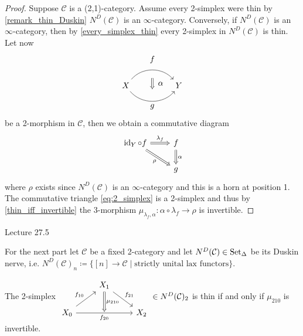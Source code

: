 \begin{proof}
	Suppose $ \mathcal{ C } $ is a  (2,1)-category.
	Assume every 2-simplex were thin by \ref{remark_thin_Duskin} $ N^D ( \mathcal{ C } ) $ is an $ \infty $-category.
	Conversely, if $ N^D (\mathcal{ C } ) $ is an $ \infty $-category, then by \ref{every_simplex_thin} every 2-simplex in $ N^D ( \mathcal{ C } ) $ is thin.
	Let now
	\[
	\begin{tikzcd}
		X
		\arrow[bend left=50]{rr}[name=U',label=above:$ f $]{}
		\arrow[bend right=50]{rr}[name=D',label=below:$ g $]{}
		&&
		Y
		\arrow[shorten <=10pt,shorten >=10pt,Rightarrow,to path={(U')-- node[label=right:$ \alpha $] {} (D')}]{} 
	\end{tikzcd}
	\]
	be a 2-morphism in $ \mathcal{ C } $, then we obtain a commutative diagram
	\begin{equation}
	\label{eq:2_simplex}
		\begin{tikzcd}	
			\id_Y \circ f 
			\ar[r, Rightarrow, " \lambda_f " ]
			\ar[rd, Rightarrow, " \rho "' ]
			&
			f
			\ar[d, Rightarrow, " \alpha " ]
			\\
			&
			g
		\end{tikzcd}
	\end{equation}
	where $\rho $ exists since $ N^D ( \mathcal{ C } ) $ is an $ \infty $-category and this is a
	horn at position 1.
	The commutative triangle \ref{eq:2_simplex} is a 2-simplex and thus by \ref{thin_iff_invertible} the 3-morphism $ \mu_{ \lambda_f, \alpha } \colon \alpha \circ \lambda_f \to \rho $ is invertible.
\end{proof}

Lecture 27.5

For the next part let $ \mathcal{ C } $ be a fixed 2-category and let $ N^D ( \mathcal{ C } ) \in \operatorname{Set}_{\Delta} $ be its Duskin nerve, i.e. $ N^D ( \mathcal{ C } )_n \coloneqq \{ [ n ] \to \mathcal{ C } \mid \text{strictly unital lax functors} \} $.
	
\begin{thm}
\label{thin_iff_invertible}
	The 2-simplex 
	$
	\begin{tikzcd}	
		&
		X_1
		\ar[rd, "f_{21}"]
		\ar[d, Rightarrow, "\mu_{ 2 1 0 }"] 
		&
		\\
		X_0
		\ar[ru, "f_{10}" ]
		\ar[rr, "f_{20}"' ]
		&
		{}
		&
		X_2
	\end{tikzcd}
	\in
	N^D ( \mathcal{ C } )_2 
	$
	is thin  if and only if $ \mu_{ 2 1 0 } $ is invertible.
\end{thm}

